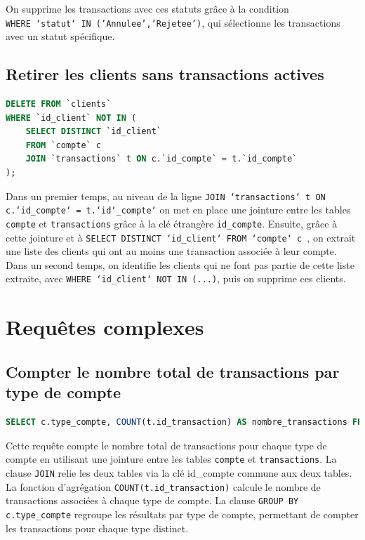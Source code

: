 \documentclass[12pt,a4paper]{article}
\begin{document}
On supprime les transactions avec ces statuts grâce à la condition \\ \texttt{WHERE `statut` IN ('Annulee','Rejetee')}, qui sélectionne les transactions avec un statut spécifique.

	\subsection{Retirer les clients sans transactions actives}
\begin{lstlisting}[language=SQL]
DELETE FROM `clients` 
WHERE `id_client` NOT IN ( 
    SELECT DISTINCT `id_client` 
    FROM `compte` c 
    JOIN `transactions` t ON c.`id_compte` = t.`id_compte` 
); 
\end{lstlisting}	

\vspace{.5cm}

Dans un premier temps, au niveau de la ligne \texttt{JOIN `transactions` t ON c.`id\_compte` = t.`id`\_compte`}  on met en place une jointure entre les tables \texttt{compte} et \texttt{transactions} grâce à la clé étrangère \texttt{id\_compte}. Ensuite, grâce à cette jointure et à \texttt{SELECT DISTINCT `id\_client` FROM `compte` c }, on extrait une liste des clients qui ont au moins une transaction associée à leur compte. Dans un second temps, on identifie les clients qui ne font pas partie de cette liste extraite, avec \texttt{WHERE `id\_client` NOT IN (...)}, puis on supprime ces clients.

\newpage

\section{Requêtes complexes}

	\subsection{Compter le nombre total de transactions par type de compte}

\begin{lstlisting}[language=SQL]
SELECT c.type_compte, COUNT(t.id_transaction) AS nombre_transactions FROM compte c JOIN transactions t ON c.id_compte = t.id_compte GROUP BY c.type_compte; 
\end{lstlisting}	

\vspace{.5cm}

Cette requête compte le nombre total de transactions pour chaque type de compte en utilisant une jointure entre les tables \texttt{compte} et \texttt{transactions}. La clause \texttt{JOIN} relie les deux tables via la clé id\_compte commune aux deux tables. La fonction d'agrégation \texttt{COUNT(t.id\_transaction)} calcule le nombre de transactions associées à chaque type de compte. La clause \texttt{GROUP BY c.type\_compte} regroupe les résultats par type de compte, permettant de compter les transactions pour chaque type distinct. 
\end{document}
